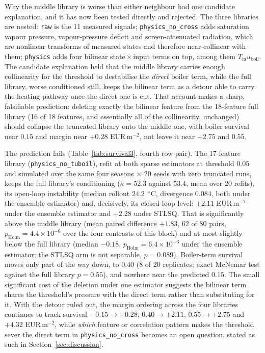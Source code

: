 Why the middle library is worse than either neighbour had one candidate explanation, and
it has now been tested directly and rejected. The three libraries are nested:
\texttt{raw} is the 11 measured signals; \texttt{physics\_no\_cross} adds saturation
vapour pressure, vapour-pressure deficit and screen-attenuated radiation, which are
nonlinear transforms of measured states and therefore near-collinear with them;
\texttt{physics} adds four bilinear state\,$\times$\,input terms on top, among them
$T_{\text{in}}u_{\mathrm{boil}}$. The candidate explanation held that the middle library
carries enough collinearity for the threshold to destabilise the \emph{direct} boiler
term, while the full library, worse conditioned still, keeps the bilinear term as a
detour able to carry the heating pathway once the direct one is cut. That account makes a
sharp, falsifiable prediction: deleting exactly the bilinear feature from the 18-feature
full library (16 of 18 features, and essentially all of the collinearity, unchanged) should collapse the truncated library onto the middle one, with boiler
survival near $0.15$ and margin near $+0.28$ EUR\,m$^{-2}$, not leave it near
$+2.75$ and $0.55$.

The prediction fails (Table~\ref{tab:survival3}, fourth row pair). The 17-feature library
(\texttt{physics\_no\_tuboil}), refit at both sparse estimators at threshold $0.05$ and
simulated over the same four seasons $\times$ 20 seeds with zero truncated runs, keeps the
full library's conditioning ($\kappa = 52.3$ against $53.4$, mean over 20 refits), its
open-loop instability (median rollout $24.2$~$^\circ$C, divergence $0.084$, both under
the ensemble estimator) and, decisively, its closed-loop level: $+2.11$ EUR\,m$^{-2}$ under the ensemble estimator
and $+2.28$ under STLSQ. That is significantly above the middle library (mean paired
difference $+1.83$, 62 of 80 pairs, $p_{\text{Holm}} = 4.4\times10^{-6}$ over the four
contrasts of this block) and at most slightly below the full library (median $-0.18$,
$p_{\text{Holm}} = 6.4\times10^{-3}$ under the ensemble estimator; the STLSQ arm is not
separable, $p = 0.089$). Boiler-term survival moves only part of the way down, to $0.40$
(8 of 20 replicates; exact McNemar test against the full library $p = 0.55$), and nowhere
near the predicted $0.15$. The small significant cost of the deletion under one estimator
suggests the bilinear term shares the threshold's pressure with the direct term rather
than substituting for it. With the detour ruled out, the margin ordering across the four
libraries continues to track survival -- $0.15 \rightarrow +0.28$, $0.40 \rightarrow
+2.11$, $0.55 \rightarrow +2.75$ and $+4.32$ EUR\,m$^{-2}$, while \emph{which} feature
or correlation pattern makes the threshold sever the direct term in
\texttt{physics\_no\_cross} becomes an open question, stated as such in
Section~\ref{sec:discussion}.

